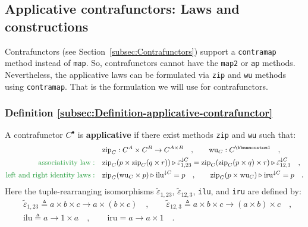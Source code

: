 \subsection{Applicative contrafunctors: Laws and constructions}

Contrafunctors (see Section~\ref{subsec:Contrafunctors}) support
a \lstinline!contramap! method instead of \lstinline!map!. So, contrafunctors
cannot have the \lstinline!map2! or \lstinline!ap! methods. Nevertheless,
the applicative laws can be formulated via \lstinline!zip! and \lstinline!wu!
methods using \lstinline!contramap!. That is the formulation we will
use for contrafunctors.

\subsubsection{Definition \label{subsec:Definition-applicative-contrafunctor}\ref{subsec:Definition-applicative-contrafunctor}}

A contrafunctor $C^{\bullet}$ is \textbf{applicative} if there exist
methods \lstinline!zip! and \lstinline!wu! such that:
\begin{align}
 & \text{zip}_{C}:C^{A}\times C^{B}\rightarrow C^{A\times B}\quad,\quad\quad\text{wu}_{C}:C^{\bbnum 1}\quad,\nonumber \\
{\color{greenunder}\text{associativity law}:}\quad & \text{zip}_{C}(p\times\text{zip}_{C}(q\times r))\triangleright\tilde{\varepsilon}_{1,23}^{\downarrow C}=\text{zip}_{C}(\text{zip}_{C}(p\times q)\times r)\triangleright\tilde{\varepsilon}_{12,3}^{\downarrow C}\quad,\label{eq:applicative-contrafunctor-associativity-law}\\
{\color{greenunder}\text{left and right identity laws}:}\quad & \text{zip}_{C}(\text{wu}_{C}\times p)\triangleright\text{ilu}^{\downarrow C}=p\quad,\quad\quad\text{zip}_{C}(p\times\text{wu}_{C})\triangleright\text{iru}^{\downarrow C}=p\quad.\label{eq:applicative-contrafunctor-identity-laws}
\end{align}
Here the tuple-rearranging isomorphisms $\tilde{\varepsilon}_{1,23}$,
$\tilde{\varepsilon}_{12,3}$, \lstinline!ilu!, and \lstinline!iru!
are defined by:
\begin{align*}
 & \tilde{\varepsilon}_{1,23}\triangleq a\times b\times c\rightarrow a\times\left(b\times c\right)\quad,\quad\quad\tilde{\varepsilon}_{12,3}\triangleq a\times b\times c\rightarrow\left(a\times b\right)\times c\quad,\\
 & \text{ilu}\triangleq a\rightarrow1\times a\quad,\quad\quad\text{iru}=a\rightarrow a\times1\quad.
\end{align*}

